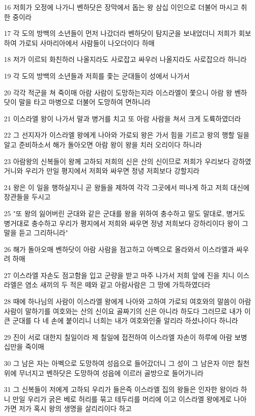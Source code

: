 \par 16 저희가 오정에 나가니 벤하닷은 장막에서 돕는 왕 삼십 이인으로 더불어 마시고 취한 중이라
\par 17 각 도의 방백의 소년들이 먼저 나갔더라 벤하닷이 탐지군을 보내었더니 저희가 회보하여 가로되 사마리아에서 사람들이 나오더이다 하매
\par 18 저가 이르되 화친하러 나올지라도 사로잡고 싸우러 나올지라도 사로잡으라 하니라
\par 19 각 도의 방백의 소년들과 저희를 좇는 군대들이 성에서 나가서
\par 20 각각 적군을 쳐 죽이매 아람 사람이 도망하는지라 이스라엘이 쫓으니 아람 왕 벤하닷이 말을 타고 마병으로 더불어 도망하여 면하니라
\par 21 이스라엘 왕이 나가서 말과 병거를 치고 또 아람 사람을 쳐서 크게 도륙하였더라
\par 22 그 선지자가 이스라엘 왕에게 나아와 가로되 왕은 가서 힘을 기르고 왕의 행할 일을 알고 준비하소서 해가 돌아오면 아람 왕이 왕을 치러 오리이다 하니라
\par 23 아람왕의 신복들이 왕께 고하되 저희의 신은 산의 신이므로 저희가 우리보다 강하였거니와 우리가 만일 평지에서 저희와 싸우면 정녕 저희보다 강할지라
\par 24 왕은 이 일을 행하실지니 곧 왕들을 제하여 각각 그곳에서 떠나게 하고 저희 대신에 장관들을 두시고
\par 25 "또 왕의 잃어버린 군대와 같은 군대를 왕을 위하여 충수하고 말도 말대로, 병거도 병거대로 충수하고 우리가 평지에서 저희와 싸우면 정녕 저희보다 강하리이다 왕이 그 말을 듣고 그리하니라"
\par 26 해가 돌아오매 벤하닷이 아람 사람을 점고하고 아벡으로 올라와서 이스라엘과 싸우려 하매
\par 27 이스라엘 자손도 점고함을 입고 군량을 받고 마주 나가서 저희 앞에 진을 치니 이스라엘은 염소 새끼의 두 적은 떼와 같고 아람사람은 그 땅에 가득하였더라
\par 28 때에 하나님의 사람이 이스라엘 왕에게 나아와 고하여 가로되 여호와의 말씀이 아람사람이 말하기를 여호와는 산의 신이요 골짜기의 신은 아니라 하도다 그러므로 내가 이 큰 군대를 다 네 손에 붙이리니 너희는 내가 여호와인줄 알리라 하셨나이다 하니라
\par 29 진이 서로 대한지 칠일이라 제 칠일에 접전하여 이스라엘 자손이 하루에 아람 보병 십만을 죽이매
\par 30 그 남은 자는 아벡으로 도망하여 성읍으로 들어갔더니 그 성이 그 남은자 이만 칠천위에 무너지고 벤하닷은 도망하여 성읍에 이르러 골방으로 들어가니라
\par 31 그 신복들이 저에게 고하되 우리가 들은즉 이스라엘 집의 왕들은 인자한 왕이라 하니 만일 우리가 굵은 베로 허리를 묶고 테두리를 머리에 이고 이스라엘 왕에게로 나아가면 저가 혹시 왕의 생명을 살리리이다 하고

